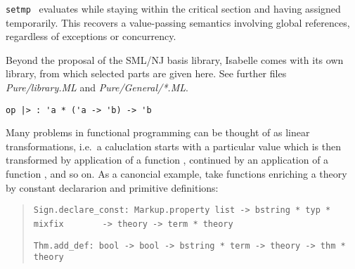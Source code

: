 \begin{isabellebody}
\begin{isamarkuptext}
\begin{description}
  \item \verb|setmp|~ evaluates 
  while staying within the critical section and having  assigned temporarily.  This recovers a value-passing
  semantics involving global references, regardless of exceptions or
  concurrency.

  \end{description}%
\end{isamarkuptext}%
\isamarkuptrue%
%
\endisatagmlref
{\isafoldmlref}%
%
\isadelimmlref
%
\endisadelimmlref
%
\isamarkuptrue%
%
\begin{isamarkuptext}%
Beyond the proposal of the SML/NJ basis library, Isabelle comes
  with its own library, from which selected parts are given here.
  See further files \emph{Pure/library.ML} and \emph{Pure/General/*.ML}.%
\end{isamarkuptext}%
\isamarkuptrue%
%
\isamarkuptrue%
%
\isadelimmlref
%
\endisadelimmlref
%
\isatagmlref
%
\begin{isamarkuptext}%
\begin{mldecls}
  \verb|op |\verb,|,\verb|> : 'a * ('a -> 'b) -> 'b| \\
  \end{mldecls}%
\end{isamarkuptext}%
\isamarkuptrue%
%
\endisatagmlref
{\isafoldmlref}%
%
\isadelimmlref
%
\endisadelimmlref
%
\isadelimML
%
\endisadelimML
%
\isatagML
%
\endisatagML
{\isafoldML}%
%
\isadelimML
%
\endisadelimML
%
\begin{isamarkuptext}%
Many problems in functional programming can be thought of
  as linear transformations, i.e.~a caluclation starts with a
  particular value  which is then transformed
  by application of a function ,
  continued by an application of a function ,
  and so on.  As a canoncial example, take functions enriching
  a theory by constant declararion and primitive definitions:

  \begin{quotation}
    \verb|Sign.declare_const: Markup.property list -> bstring * typ * mixfix|\isasep\isanewline%
\verb|       -> theory -> term * theory|

    \verb|Thm.add_def: bool -> bool -> bstring * term -> theory -> thm * theory|
  \end{quotation}


\end{isamarkuptext}
\end{isabellebody}

